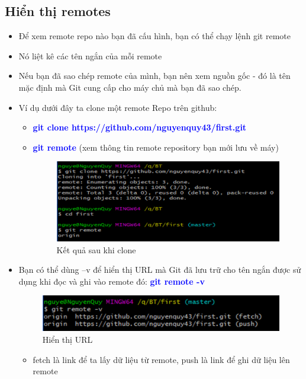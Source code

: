 \documentclass[12pt,a4paper]{report}
\begin{document}
\subsection{Hiển thị remotes} 
\begin{itemize}
\item Để xem remote repo nào bạn đã cấu hình, bạn có thể chạy lệnh git remote
\item Nó liệt kê các tên ngắn của mỗi remote
\item Nếu bạn đã sao chép remote của mình, bạn nên xem nguồn gốc - đó là tên mặc định mà Git cung cấp cho máy chủ mà bạn đã sao chép. 
\item Ví dụ dưới đây ta clone một remote Repo trên github:
	\begin{itemize}
		\item \textcolor{blue}{\bf git clone https://github.com/nguyenquy43/first.git}
		\item \textcolor{blue}{\bf git remote} (xem thông tin remote repository bạn mới lưu về máy)

\begin{figure}[!ht]
	\centering
	\includegraphics[width=0.8\linewidth]{screenshot032}
	\caption{Kết quả sau khi clone}
	\label{fig:screenshot032}
	\end{figure}
	\end{itemize}
\item Bạn có thể dùng –v để hiển thị URL mà Git đã lưu trữ cho tên ngắn được sử dụng khi đọc và ghi vào remote đó: \textcolor{blue}{\bf git remote -v}

\begin{figure}[!ht]
	\centering
	\includegraphics[width=0.8\linewidth]{screenshot033}
	\caption{Hiển thị URL}
	\label{fig:screenshot033}
\end{figure}
	\begin{itemize}
\item fetch là link để ta lấy dữ liệu từ remote, push là link để ghi dữ liệu lên remote
\end{itemize}\end{itemize}
\end{document}
